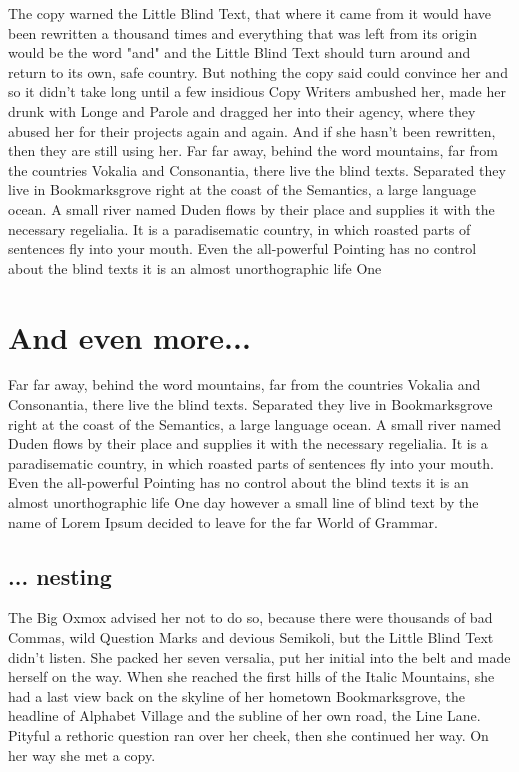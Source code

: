 The copy warned the Little Blind Text, that where it came from it would
have been rewritten a thousand times and everything that was left from its
origin would be the word "and" and the Little Blind Text should turn around
and return to its own, safe country. But nothing the copy said could
convince her and so it didn't take long until a few insidious Copy Writers
ambushed her, made her drunk with Longe and Parole and dragged her into
their agency, where they abused her for their projects again and again. And
if she hasn't been rewritten, then they are still using her. Far far away,
behind the word mountains, far from the countries Vokalia and Consonantia,
there live the blind texts. Separated they live in Bookmarksgrove right at
the coast of the Semantics, a large language ocean. A small river named
Duden flows by their place and supplies it with the necessary
regelialia. It is a paradisematic country, in which roasted parts of
sentences fly into your mouth. Even the all-powerful Pointing has no
control about the blind texts it is an almost unorthographic life One 

\section{And even more...}
\label{sec:even-more}

Far far away, behind the word mountains, far from the countries Vokalia and Consonantia, there live the blind texts. Separated they live in Bookmarksgrove right at the coast of the Semantics, a large language ocean. A small river named Duden flows by their place and supplies it with the necessary regelialia. It is a paradisematic country, in which roasted parts of sentences fly into your mouth. Even the all-powerful Pointing has no control about the blind texts it is an almost unorthographic life One day however a small line of blind text by the name of Lorem Ipsum decided to leave for the far World of Grammar.

\subsection{... nesting}
\label{sec:...-nesting}

The Big Oxmox advised her not to do so, because there were thousands of bad
Commas, wild Question Marks and devious Semikoli, but the Little Blind Text
didn't listen. She packed her seven versalia, put her initial into the belt
and made herself on the way. When she reached the first hills of the Italic
Mountains, she had a last view back on the skyline of her hometown
Bookmarksgrove, the headline of Alphabet Village and the subline of her own
road, the Line Lane. Pityful a rethoric question ran over her cheek, then
she continued her way. On her way she met a copy.

